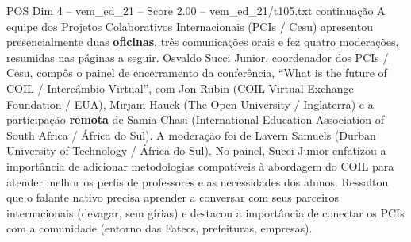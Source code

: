 \begin{textsample}{POS Dim 4 – vem\_ed\_21 – Score 2.00 – vem\_ed\_21/t105.txt}  \label{ex:f4_pos_100}
continuação A equipe dos Projetos Colaborativos Internacionais (PCIs / Cesu) apresentou presencialmente duas \textbf{oficinas}, três comunicações orais e fez quatro moderações, resumidas nas páginas a seguir.
Osvaldo Succi Junior, coordenador dos PCIs / Cesu, compôs o painel de encerramento da conferência, “What is the future of COIL / Intercâmbio Virtual”, com Jon Rubin (COIL Virtual Exchange Foundation / EUA), Mirjam Hauck (The Open University / Inglaterra) e a participação \textbf{remota} de Samia Chasi (International Education Association of South Africa / África do Sul).
A moderação foi de Lavern Samuels (Durban University of Technology / África do Sul).
No painel, Succi Junior enfatizou a importância de adicionar metodologias compatíveis à abordagem do COIL para atender melhor os perfis de professores e as necessidades dos alunos.
Ressaltou que o falante nativo precisa aprender a conversar com seus parceiros internacionais (devagar, sem gírias) e destacou a importância de conectar os PCIs com a comunidade (entorno das Fatecs, prefeituras, empresas).

\end{textsample}
